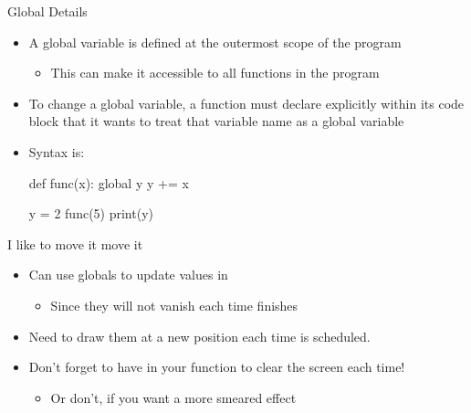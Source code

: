 \documentclass[pdf, aspectratio=169, 12pt]{beamer}
\begin{document}
\begin{frame}[fragile]{Global Details}
	\vspace{5mm}
	\begin{itemize}
		\item A global variable is defined at the outermost scope of the program
			\begin{itemize}
				\item This can make it accessible to all functions in the program
			\end{itemize}
		\item To change a global variable, a function must declare explicitly within its code block that it wants to treat that variable name as a global variable
		\item Syntax is: 
			\begin{pythoncode}
				def func(x):
					global y
					y += x

				y = 2
				func(5)
				print(y)
			\end{pythoncode}
	\end{itemize}
\end{frame}

\begin{frame}{I like to move it move it}
	\begin{itemize}
		\item Can use globals to update values in 
			\begin{itemize}
				\item Since  they will not vanish each time  finishes
			\end{itemize}
		\item Need to draw them at a new position each time  is scheduled.
		\item Don't forget to have  in your  function to clear the screen each time!
			\begin{itemize}
				\item Or don't, if you want a more smeared effect
			\end{itemize}
	\end{itemize}
\end{frame}

\end{document}
